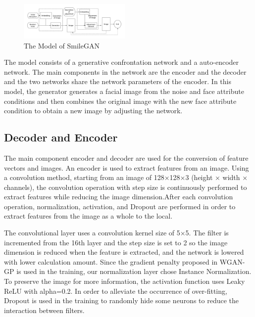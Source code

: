 \begin{figure}
    \begin{center}
    \includegraphics[width=0.48\textwidth]{figures/model.pdf}
    \caption{The Model of SmileGAN}
    \label{smliegan}
    \end{center}
\end{figure}

The model consists of a generative confrontation network and a auto-encoder network.
The main components in the network are the encoder and the decoder and the two networks share the network parameters of the encoder.
In this model, the generator generates a facial image from the noise and face attribute conditions and then combines the original image with the new face attribute condition to obtain a new image by adjusting the network.


\subsection{Decoder and Encoder}

The main component encoder and decoder are used for the conversion of feature vectors and images.
An encoder is used to extract features from an image.
Using a convolution method, starting from an image of 128×128×3 (height × width × channels),
    the convolution operation with step size is continuously performed to extract features while reducing the image dimension.After each convolution operation,
    normalization, activation, and Dropout are performed in order to extract features from the image as a whole to the local.

The convolutional layer uses a convolution kernel size of 5×5.
The filter is incremented from the 16th layer and the step size is set to 2 so the image dimension is reduced when the feature is extracted,
    and the network is lowered with lower calculation amount.
Since the gradient penalty proposed in WGAN-GP is used in the training,
    our normalization layer chose Instance Normalization.
To preserve the image for more information, the activation function uses Leaky ReLU with alpha=0.2.
In order to alleviate the occurrence of over-fitting,
    Dropout is used in the training to randomly hide some neurons to reduce the interaction between filters.

